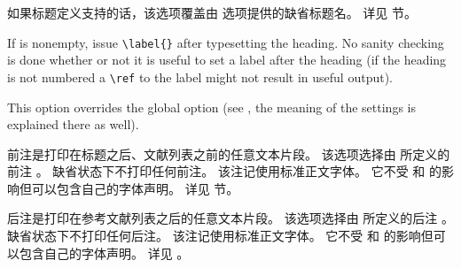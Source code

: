 \begin{optionlist*}
如果标题定义支持的话，该选项覆盖由  选项提供的缺省标题名。
详见  节。

If  is nonempty, issue \texttt{\textbackslash label\{\}} after typesetting the heading. No sanity checking is done whether or not it is useful to set a label after the heading (\eg if the heading is not numbered a \texttt{\textbackslash ref} to the label might not result in useful output).


This option overrides the global  option (see , the meaning of the settings is explained there as well).


前注是打印在标题之后、文献列表之前的任意文本片段。
该选项选择由  所定义的前注 。
缺省状态下不打印任何前注。
该注记使用标准正文字体。
它不受  和  的影响但可以包含自己的字体声明。
详见  节。



后注是打印在参考文献列表之后的任意文本片段。
该选项选择由  所定义的后注 。
缺省状态下不打印任何后注。
该注记使用标准正文字体。
它不受  和  的影响但可以包含自己的字体声明。
详见 。




\end{optionlist*}
